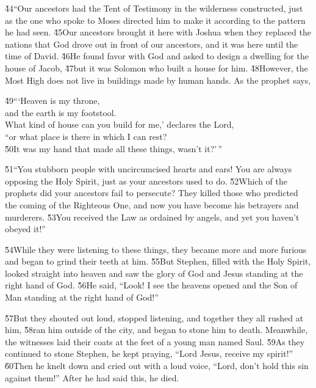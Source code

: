 \v{44}``Our ancestors had the Tent of Testimony in the wilderness constructed, just as the one who spoke to Moses directed him to make it according to the pattern he had seen. \v{45}Our ancestors brought it here with Joshua when they replaced the nations that God drove out in front of our ancestors, and it was here until the time of David. \v{46}He found favor with God and asked to design a dwelling for the house of Jacob, \v{47}but it was Solomon who built a house for him. \v{48}However, the Most High does not live in buildings made by human hands. As the prophet says,

\begin{poetry}
\poeml \v{49}```Heaven is my throne, \\
\poemll    and the earth is my footstool. \\
\poeml What kind of house can you build for me,' declares the Lord, \\
\poemll    ``or what place is there in which I can rest? \\
\poeml \v{50}It was my hand that made all these things, wasn't it?'\,''
\end{poetry}

\v{51}``You stubborn people with uncircumcised hearts and ears! You are always opposing the Holy Spirit, just as your ancestors used to do. \v{52}Which of the prophets did your ancestors fail to persecute? They killed those who predicted the coming of the Righteous One, and now you have become his betrayers and murderers. \v{53}You received the Law as ordained by angels, and yet you haven't obeyed it!''

\v{54}While they were listening to these things, they became more and more furious and began to grind their teeth at him. \v{55}But Stephen, filled with the Holy Spirit, looked straight into heaven and saw the glory of God and Jesus standing at the right hand of God. \v{56}He said, ``Look! I see the heavens opened and the Son of Man standing at the right hand of God!''

\v{57}But they shouted out loud, stopped listening, and together they all rushed at him, \v{58}ran him outside of the city, and began to stone him to death. Meanwhile, the witnesses laid their coats at the feet of a young man named Saul. \v{59}As they continued to stone Stephen, he kept praying, ``Lord Jesus, receive my spirit!'' \v{60}Then he knelt down and cried out with a loud voice, ``Lord, don't hold this sin against them!'' After he had said this, he died.

